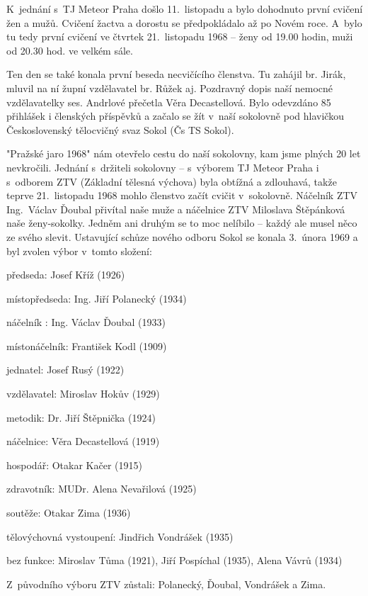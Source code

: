 \documentclass[a5paper, 11pt, twoside]{article}
\begin{document}
K~jednání s~TJ Meteor Praha došlo 11.~listopadu a bylo dohodnuto první
cvičení žen a mužů. Cvičení žactva a dorostu se předpokládalo až po
Novém roce. A~bylo tu tedy první cvičení ve čtvrtek 21.~listopadu 1968
-- ženy od 19.00 hodin, muži od 20.30 hod. ve velkém sále.

Ten den se také konala první beseda necvičícího členstva. Tu zahájil br.
Jirák, mluvil na ní župní vzdělavatel br. Růžek aj. Pozdravný dopis naší
nemocné vzdělavatelky ses. Andrlové přečetla Věra Decastellová. Bylo
odevzdáno 85 přihlášek i členských příspěvků a začalo se žít v~naší
sokolovně pod hlavičkou Československý tělocvičný svaz Sokol (Čs TS
Sokol).

"Pražské jaro 1968" nám otevřelo cestu do naší sokolovny, kam jsme
plných 20 let nevkročili. Jednání s~držiteli sokolovny -- s~výborem TJ
Meteor Praha i s~odborem ZTV (Základní tělesná výchova) byla obtížná a
zdlouhavá, takže teprve 21.~listopadu 1968 mohlo členstvo začít cvičit
v~sokolovně. Náčelník ZTV Ing.~Václav Ďoubal přivítal naše muže a
náčelnice ZTV Miloslava Štěpánková naše ženy-sokolky. Jedněm ani druhým
se to moc nelíbilo -- každý ale musel něco ze svého slevit. Ustavující
schůze nového odboru Sokol se konala 3.~února 1969 a byl zvolen výbor
v~tomto složení:
\smallskip

\noindent předseda: Josef Kříž (1926)

\noindent místopředseda: Ing. Jiří Polanecký (1934)

\noindent náčelník : Ing. Václav Ďoubal (1933)

\noindent místonáčelník: František Kodl (1909)

\noindent jednatel: Josef Rusý (1922)

\noindent vzdělavatel: Miroslav Hokův (1929)

\noindent metodik: Dr. Jiří Štěpnička (1924)

\noindent náčelnice: Věra Decastellová (1919)

\noindent hospodář: Otakar Kačer (1915)

\noindent zdravotník: MUDr. Alena Nevařilová (1925)

\noindent soutěže: Otakar Zima (1936)

\noindent tělovýchovná vystoupení: Jindřich Vondrášek (1935)

\noindent bez funkce: Miroslav Tůma (1921), Jiří Pospíchal (1935), Alena Vávrů (1934)

\noindent Z~původního výboru ZTV zůstali: Polanecký, Ďoubal, Vondrášek a Zima.
\end{document}
